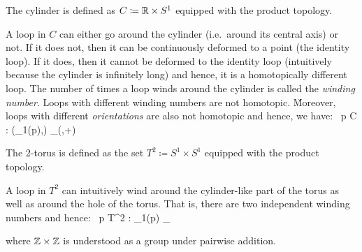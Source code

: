 \be
The cylinder is defined as $C \coloneqq \mathbb{R}\times S^1$ equipped with the product topology.

\begin{center}
\end{center}

A loop in $C$ can either go around the cylinder (i.e.\ around its central axis) or not. If it does not, then it can
be continuously deformed to a point (the identity loop). If it does, then it cannot be deformed to the identity loop
(intuitively because the cylinder is infinitely long) and hence, it is a homotopically different loop. The number of
times a loop winds around the cylinder is called the \emph{winding number}. Loops with different winding numbers are
not homotopic. \v

Moreover, loops with different \emph{orientations} are also not homotopic and hence, we have:
\bse
\forall \, p \in C : (\pi_1(p),\bullet) \cong_(\Z,+)
\ese
\ee

\be
The 2-torus is defined as the set $T^2 \coloneqq S^1\times S^1$ equipped with the product topology.

\begin{center}
\end{center}

A loop in $T^2$ can intuitively wind around the cylinder-like part of the torus as well as around the hole of the
torus. That is, there are two independent winding numbers and hence:
\bse
\forall \, p \in T^2 : \pi_1(p) \cong_\Z\times \Z
\ese

where $\mathbb{Z}\times \mathbb{Z}$ is understood as a group under pairwise addition.
\ee